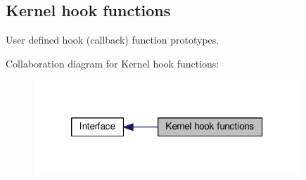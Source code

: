 \hypertarget{group__kern__hook}{\subsection{Kernel hook functions}
\label{group__kern__hook}
}


User defined hook (callback) function prototypes.  


Collaboration diagram for Kernel hook functions\-:\nopagebreak
\begin{figure}[H]
\begin{center}
\leavevmode
\includegraphics[width=284pt]{group__kern__hook}
\end{center}
\end{figure}
